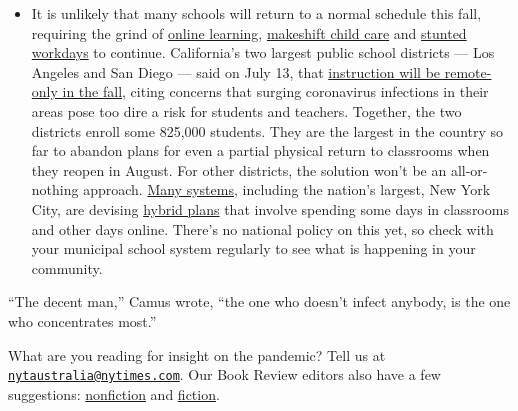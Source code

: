 \begin{itemize}
  \begin{itemize}
  \tightlist
  \item
    It is unlikely that many schools will return to a normal schedule
    this fall, requiring the grind of
    \href{https://www.nytimes.com/2020/06/05/us/coronavirus-education-lost-learning.html?action=click\&pgtype=Article\&state=default\&region=MAIN_CONTENT_3\&context=storylines_faq}{online
    learning},
    \href{https://www.nytimes.com/2020/05/29/us/coronavirus-child-care-centers.html?action=click\&pgtype=Article\&state=default\&region=MAIN_CONTENT_3\&context=storylines_faq}{makeshift
    child care} and
    \href{https://www.nytimes.com/2020/06/03/business/economy/coronavirus-working-women.html?action=click\&pgtype=Article\&state=default\&region=MAIN_CONTENT_3\&context=storylines_faq}{stunted
    workdays} to continue. California's two largest public school
    districts --- Los Angeles and San Diego --- said on July 13, that
    \href{https://www.nytimes.com/2020/07/13/us/lausd-san-diego-school-reopening.html?action=click\&pgtype=Article\&state=default\&region=MAIN_CONTENT_3\&context=storylines_faq}{instruction
    will be remote-only in the fall}, citing concerns that surging
    coronavirus infections in their areas pose too dire a risk for
    students and teachers. Together, the two districts enroll some
    825,000 students. They are the largest in the country so far to
    abandon plans for even a partial physical return to classrooms when
    they reopen in August. For other districts, the solution won't be an
    all-or-nothing approach.
    \href{https://bioethics.jhu.edu/research-and-outreach/projects/eschool-initiative/school-policy-tracker/}{Many
    systems}, including the nation's largest, New York City, are
    devising
    \href{https://www.nytimes.com/2020/06/26/us/coronavirus-schools-reopen-fall.html?action=click\&pgtype=Article\&state=default\&region=MAIN_CONTENT_3\&context=storylines_faq}{hybrid
    plans} that involve spending some days in classrooms and other days
    online. There's no national policy on this yet, so check with your
    municipal school system regularly to see what is happening in your
    community.
  \end{itemize}
\end{itemize}

``The decent man,'' Camus wrote, ``the one who doesn't infect anybody,
is the one who concentrates most.''

What are you reading for insight on the pandemic? Tell us at
\href{mailto:nytaustralia@nytimes.com}{\nolinkurl{nytaustralia@nytimes.com}}.
Our Book Review editors also have a few suggestions:
\href{https://www.nytimes.com/2020/02/24/books/pandemic-books-coronavirus.html}{nonfiction}
and
\href{https://www.nytimes.com/2020/03/12/books/coronavirus-reading.html}{fiction}.

